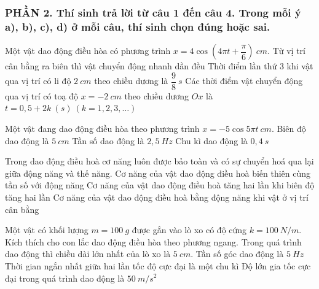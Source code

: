 \subsubsection*{PHẦN 2. Thí sinh trả lời từ câu 1 đến câu 4. Trong mỗi ý a), b), c), d) ở mỗi câu, thí sinh chọn đúng hoặc sai.}
\setcounter{ex}{0}
\begin{ex}
	Một vật dao động điều hòa có phương trình $x=4 \cos (4 \pi t+\dfrac{\pi}{6})\ cm$.
	{Từ vị trí cân bằng ra biên thì vật chuyển động nhanh dần đều}
	{Thời điểm lần thứ $3$ khi vật qua vị trí có li độ $2 \ cm$ theo chiều dương là $\dfrac{9}{8} \ s$}
	{Các thời điểm vật chuyển động qua vị trí có toạ độ $x=-2 \ cm$ theo chiều dương $O x$ là $t=0,5+2 k\ (s)\ (k=1,2,3, \ldots)$} 
\end{ex}
\begin{ex}
	Một vật đang dao động điều hòa theo phương trình $x=-5 \cos 5 \pi t\ cm$.
	{\True Biên độ dao động là $5 \ cm$}
	{\True Tần số dao động là $2,5 \ Hz$}
	{\True Chu kì dao động là $0,4 \ s$}
\end{ex}

\begin{ex}
	Trong dao động điều hoà cơ năng luôn được bảo toàn và có sự chuyển hoá qua lại giữa động năng và thế năng.
	{Cơ năng của vật dao động điều hoà biến thiên cùng tần số với động năng}
	{Cơ năng của vật dao động điều hoà tăng hai lần khi biên độ tăng hai lần}
	{\True Cơ năng của vật dao động điều hoà bằng động năng khi vật ở vị trí cân bằng}
\end{ex}
\begin{ex}
	Một vật có khối lượng $m=100 \ g$ được gắn vào lò xo có độ cứng $k=100 \ N/m$. Kích thích cho con lắc dao động điều hòa theo phương ngang. Trong quá trình dao động thì chiều dài lớn nhất của lò xo là $5 \ cm$.
	{Tần số góc dao động là $5 \ Hz$}
	{Thời gian ngắn nhất giữa hai lần tốc độ cực đại là một chu kì}
	{\True Độ lớn gia tốc cực đại trong quá trình dao động là $50 \ m/s^2$}
\end{ex}

